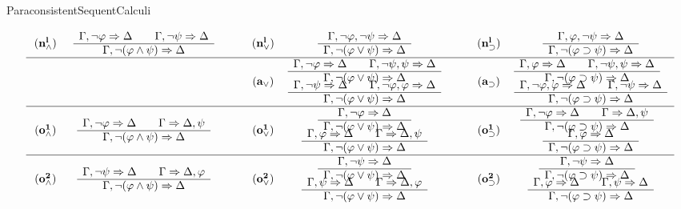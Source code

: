 \begin{entry}{ParaconsistentSequentCalculi}
\begin{calculus}
\[\begin{tabular}{ccc@{\hspace{2em}}ccc@{\hspace{2em}}cc}
${\name{n^l_\w}}$ &   $\drul{,\neg \vfi}{}{,\neg \psi}{}{,\neg(\vfi\w\psi)}{}$ &&
${\name{n^l_\vee}}$ & $\srul{,\neg\vfi,\neg\psi}{}{,\neg(\vfi\vee\psi)}{}$ &&
${\name{n^l_\su}}$  &  $\srul{,\vfi,\neg\psi}{}{,\neg(\vfi\su \psi)}{}$  \\\hline

\vspace{-1.5em}
    & &&  &  $\drul{,\neg\vfi}{}{,\neg\psi,\psi}{}{,\neg     (\vfi\vee\psi)}{}$ && &  $\drul{,\vfi}{}{,\neg\psi,\psi}{}{,\neg    (\vfi\su\psi)}{}$ \ \  \\
\vspace{-1.5em}
\phantom{${\name{a_\wedge}}$ }
  &
  \phantom{$\drul{,\neg \vfi}{}{,\neg\psi}{}{,\neg  (\vfi\w\psi)}{}$ }
  &&
 ${\name{a_\vee}}$ & &&   ${\name{a_\su}}$  & \ \ \\
  &&&&  $\drul{,\neg\psi}{}{,\neg\vfi,\vfi}{}{,\neg(\vfi\vee\psi)}{}$ &&   &    $\drul{,\neg\vfi,\vfi}{}{,\neg\psi}{}{,\neg      (\vfi\su\psi)}{}$ \\\hline

\vspace{-1.5em}
&&&&   $\srul{,\neg \vfi}{}{,\neg (\vfi\vee\psi)}{}$   &&& $\drul{,\neg \vfi}{}{}{,\psi}{,\neg (\vfi\su\psi)}{}$  \ \ \\
\vspace{-1.5em}
 ${\name{o^{1}_\w}}$ &  $\drul{,\neg \vfi}{}{}{,\psi}{,\neg (\vfi\w\psi)}{}$ &&
 ${\name{o^{1}_\vee}}$ &&& ${\name{o^{1}_\su}}$ & \ \ \\
 &&&&  $\drul{,\vfi}{}{}{,\psi}{,\neg (\vfi\vee\psi)}{}$ &&&
 $\srul{,\vfi}{}{,\neg (\vfi\su\psi)}{}$ \\\hline

\vspace{-1.5em}
&&&& $\srul{,\neg \psi}{}{,\neg (\vfi\vee\psi)}{}$ &&&   $\srul{,\neg \psi}{}{,\neg (\vfi\su\psi)}{}$ \ \ \\
\vspace{-1.5em}
 ${\name{o^{2}_\w}}$ &  $\drul{,\neg \psi}{}{}{,\vfi}{,\neg (\vfi\w\psi)}{}$ &&
 ${\name{o^{2}_\vee}}$ &&&
 ${\name{o^{2}_\su}}$ & \ \ \\
 &&&& $\drul{,\psi}{}{}{,\vfi}{,\neg (\vfi\vee\psi)}{}$ &&&$\drul{,\vfi}{}{,\psi}{}{,\neg (\vfi\su\psi)}{}$%

\end{tabular}
\]
\normalsize
\end{calculus}


\end{entry}

